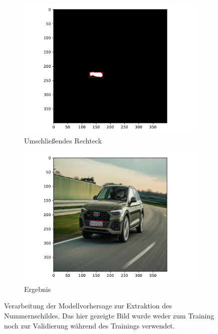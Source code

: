 \begin{figure}
\begin{subfigure}{0.495\textwidth}
        \includegraphics[width=\textwidth]{abbildungen/verarbeitung_3}
        \caption{Umschlie{\ss}endes Rechteck}
    \end{subfigure}
    \begin{subfigure}{0.495\textwidth}
        \centering
        \includegraphics[width=\textwidth]{abbildungen/verarbeitung_4}
        \caption{Ergebnis}
    \end{subfigure}
    \caption[Verarbeitung der Modellvorhersage]{Verarbeitung der Modellvorhersage zur Extraktion des
        Nummernschildes. Das hier gezeigte Bild wurde weder zum Training
        noch zur Validierung w\"ahrend des Trainings verwendet.}
    \label{fig:verarbeitung}
\end{figure}

